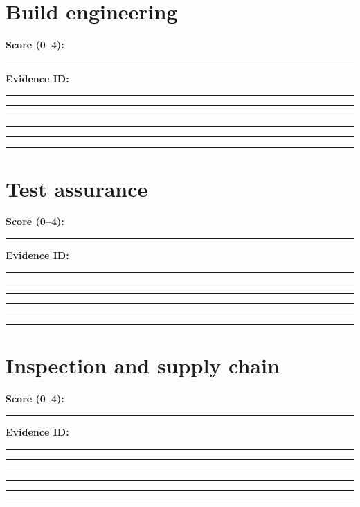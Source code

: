 \documentclass[11pt,letterpaper]{article}
\begin{document}
\section{Build engineering}
\noindent\textbf{Score (0--4):}\hspace{1.5cm}\rule{2cm}{0.4pt}\quad\textbf{Evidence ID:}\rule{4cm}{0.4pt}

\vspace{2mm}
\noindent\rule{0.93\linewidth}{0.4pt}\par\vspace{13pt}
\noindent\rule{0.93\linewidth}{0.4pt}\par\vspace{13pt}
\noindent\rule{0.93\linewidth}{0.4pt}\par\vspace{13pt}
\noindent\rule{0.93\linewidth}{0.4pt}\par\vspace{13pt}
\noindent\rule{0.93\linewidth}{0.4pt}\par\vspace{13pt}
\section{Test assurance}
\noindent\textbf{Score (0--4):}\hspace{1.5cm}\rule{2cm}{0.4pt}\quad\textbf{Evidence ID:}\rule{4cm}{0.4pt}

\vspace{2mm}
\noindent\rule{0.93\linewidth}{0.4pt}\par\vspace{13pt}
\noindent\rule{0.93\linewidth}{0.4pt}\par\vspace{13pt}
\noindent\rule{0.93\linewidth}{0.4pt}\par\vspace{13pt}
\noindent\rule{0.93\linewidth}{0.4pt}\par\vspace{13pt}
\noindent\rule{0.93\linewidth}{0.4pt}\par\vspace{13pt}
\section{Inspection and supply chain}
\noindent\textbf{Score (0--4):}\hspace{1.5cm}\rule{2cm}{0.4pt}\quad\textbf{Evidence ID:}\rule{4cm}{0.4pt}

\vspace{2mm}
\noindent\rule{0.93\linewidth}{0.4pt}\par\vspace{13pt}
\noindent\rule{0.93\linewidth}{0.4pt}\par\vspace{13pt}
\noindent\rule{0.93\linewidth}{0.4pt}\par\vspace{13pt}
\noindent\rule{0.93\linewidth}{0.4pt}\par\vspace{13pt}
\noindent\rule{0.93\linewidth}{0.4pt}\par\vspace{13pt}
\end{document}
